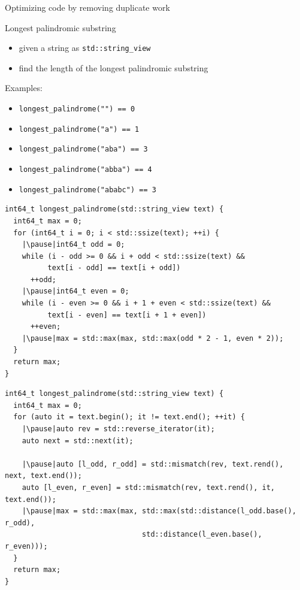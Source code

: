 \documentclass[aspectratio=169]{beamer}
\begin{document}

\begin{frame}[c]
  \begin{center}
      \huge Optimizing code by removing duplicate work
  \end{center}
\end{frame}

\begin{frame}{Longest palindromic substring}
  \begin{itemize}
      \item given a string as \texttt{std::string_view}
      \item find the length of the longest palindromic substring
  \end{itemize}
  \pause
Examples:
  \begin{itemize}
      \item \texttt{longest_palindrome("") == 0}
      \item \texttt{longest_palindrome("a") == 1}
      \item \texttt{longest_palindrome("aba") == 3}
      \item \texttt{longest_palindrome("abba") == 4}
      \item \texttt{longest_palindrome("ababc") == 3}
  \end{itemize}
\end{frame}

\begin{frame}[fragile]{}
\begin{verbatim}
int64_t longest_palindrome(std::string_view text) {
  int64_t max = 0;
  for (int64_t i = 0; i < std::ssize(text); ++i) {
    |\pause|int64_t odd = 0;
    while (i - odd >= 0 && i + odd < std::ssize(text) &&
          text[i - odd] == text[i + odd])
      ++odd;
    |\pause|int64_t even = 0;
    while (i - even >= 0 && i + 1 + even < std::ssize(text) &&
          text[i - even] == text[i + 1 + even])
      ++even;
    |\pause|max = std::max(max, std::max(odd * 2 - 1, even * 2));
  }
  return max;
}
\end{verbatim}
\end{frame}

\begin{frame}[fragile]{}
\begin{verbatim}
int64_t longest_palindrome(std::string_view text) {
  int64_t max = 0;
  for (auto it = text.begin(); it != text.end(); ++it) {
    |\pause|auto rev = std::reverse_iterator(it);
    auto next = std::next(it);

    |\pause|auto [l_odd, r_odd] = std::mismatch(rev, text.rend(), next, text.end());
    auto [l_even, r_even] = std::mismatch(rev, text.rend(), it, text.end());
    |\pause|max = std::max(max, std::max(std::distance(l_odd.base(), r_odd),
                                std::distance(l_even.base(), r_even)));
  }
  return max;
}
\end{verbatim}
\end{frame}
\end{document}
